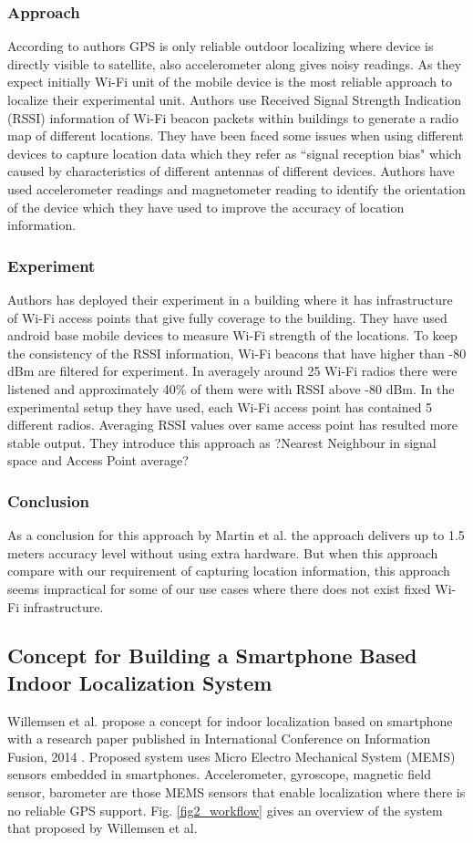 \subsubsection{Approach}
According to authors GPS is only reliable outdoor localizing where device is directly visible to satellite, also accelerometer along gives noisy readings. As they expect initially Wi-Fi unit of the mobile device is the most reliable approach to localize their experimental unit. Authors use Received Signal Strength Indication (RSSI) information of Wi-Fi beacon packets within buildings to generate a radio map of different locations. They have been faced some issues when using different devices to capture location data which they refer as ``signal reception bias" which caused by characteristics of different antennas of different devices. Authors have used accelerometer readings and magnetometer reading to identify the orientation of the device which they have used to improve the accuracy of location information.

\subsubsection{Experiment}
Authors has deployed their experiment in a building where it has infrastructure of Wi-Fi access points that give fully coverage to the building. They have used android base mobile devices to measure Wi-Fi strength of the locations. To keep the consistency of the RSSI information, Wi-Fi beacons that have higher than -80 dBm are filtered for experiment. In averagely around 25 Wi-Fi radios there were listened and approximately 40\% of them were with RSSI above -80 dBm.
In the experimental setup they have used, each Wi-Fi access point has contained 5 different radios. Averaging RSSI values over same access point has resulted more stable output. They introduce this approach as ?Nearest Neighbour in signal space and Access Point average?

\subsubsection{Conclusion}
As a conclusion for this approach by Martin et al. the approach delivers up to 1.5 meters accuracy level without using extra hardware. But when this approach compare with our requirement of capturing location information, this approach seems impractical for some of our use cases where there does not exist fixed Wi-Fi infrastructure.

\subsection{Concept for Building a Smartphone Based Indoor Localization System}
Willemsen et al. propose a concept for indoor localization based on smartphone with a research paper published in International Conference on Information Fusion, 2014 \cite{Willemsen14}. Proposed system uses Micro Electro Mechanical System (MEMS) sensors embedded in smartphones. Accelerometer, gyroscope, magnetic field sensor, barometer are those MEMS sensors that enable localization where there is no reliable GPS support. Fig. \ref{fig2_workflow} gives an overview of the system that proposed by Willemsen et al.

